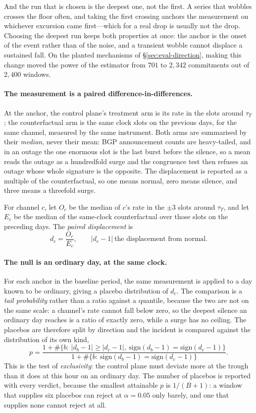 And the run that is chosen is the deepest one, not the first. A series
that wobbles crosses the floor often, and taking the first crossing
anchors the measurement on whichever excursion came first---which for
a real drop is usually not the drop. Choosing the deepest run keeps
both properties at once: the anchor is the onset of the event rather
than of the noise, and a transient wobble cannot displace a sustained
fall. On the planted mechanisms of \S\ref{sec:eval-direction}, making
this change moved the power of the estimator from $701$ to $2{,}342$
commitments out of $2{,}400$ windows.

\paragraph{The measurement is a paired difference-in-differences.} At the
anchor, the control plane's treatment arm is its rate in the slots around
$\tau_T$; the counterfactual arm is the same clock slots on the previous
days, for the same channel, measured by the same instrument. Both arms
are summarised by their \emph{median}, never their mean: BGP announcement
counts are heavy-tailed, and in an outage the one enormous slot is the
last burst before the silence, so a mean reads the outage as a
hundredfold surge and the congruence test then refuses an outage whose
whole signature is the opposite. The displacement is reported as a
multiple of the counterfactual, so one means normal, zero means silence,
and three means a threefold surge.

\begin{definition}
\label{def:displacement}
For channel $c$, let $O_c$ be the median of $c$'s rate in the
$\pm 3$ slots around $\tau_T$, and let $E_c$ be the median of the
same-clock counterfactual over those slots on the preceding days. The
\emph{paired displacement} is
\[
d_c=\frac{O_c}{E_c},\qquad |d_c-1|\ \text{the displacement from normal}.
\]
\end{definition}

\paragraph{The null is an ordinary day, at the same clock.} For each
anchor in the baseline period, the same measurement is applied to a day
known to be ordinary, giving a placebo distribution of $d_c$. The
comparison is a \emph{tail probability} rather than a ratio against a
quantile, because the two are not on the same scale: a channel's rate
cannot fall below zero, so the deepest silence an ordinary day reaches is
a ratio of exactly zero, while a surge has no ceiling. The placebos are
therefore split by direction and the incident is compared against the
distribution of its own kind,
\[
p=\frac{1+\#\{b:\ |d_b-1|\ge|d_c-1|,\ \mathrm{sign}(d_b-1)=\mathrm{sign}(d_c-1)\}}{1+\#\{b:\ \mathrm{sign}(d_b-1)=\mathrm{sign}(d_c-1)\}} .
\]
This is the test of \emph{exclusivity}: the control plane must deviate
more at the trough than it does at this hour on an ordinary day. The
number of placebos is reported with every verdict, because the smallest
attainable $p$ is $1/(B+1)$: a window that supplies six placebos can
reject at $\alpha=0.05$ only barely, and one that supplies none cannot
reject at all.

